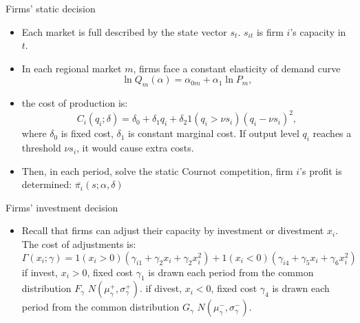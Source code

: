 \documentclass[aspectratio=169]{beamer}  %
\begin{document}
\begin{frame}{Firms' static decision}    
    \begin{itemize}
    \item Each market is full described by the state vector $s_{t}$. $s_{it}$ is firm $i$'s capacity in $t$.
    \item In each regional market $m$, firms face a constant elasticity of demand curve
    \[
    \ln Q_{m}(\alpha) = \alpha_{0m} + \alpha_1 \ln P_{m},
    \]
    \item the cost of production is:
    \[
    C_i(q_i; \delta) = \delta_0 + \delta_1 q_i + \delta_2 1(q_i > \nu s_i)(q_i - \nu s_i)^2, 
    \]
    where $\delta_0$ is fixed cost, $\delta_1$ is constant marginal cost. If output level $q_{i}$ reaches a threshold $\nu s_i$, it would cause extra costs.
    \item Then, in each period, solve the static Cournot competition, firm $i$'s profit is determined: $\bar{\pi_i}(s;\alpha, \delta)$
  
    \end{itemize}
\end{frame}

\begin{frame}{Firms' investment decision}    
    \begin{itemize}
   \item Recall that firms can adjust their capacity by investment or divestment $x_i$. The cost of adjustments is:
   \[
    \Gamma(x_i;\gamma)=1(x_i>0)(\gamma_{i1}+\gamma_2x_i+\gamma_2x_i^2)+1(x_i<0)(\gamma_{i4}+\gamma_5x_i+\gamma_6x_i^2)
    \]
    if invest, $x_i>0$, fixed cost $\gamma_{1}$ is drawn each period from the common distribution $F_{\gamma}$ $N(\mu_{\gamma}^+,\sigma_{\gamma}^+)$.
    if divest, $x_i<0$, fixed cost $\gamma_{4}$ is drawn each period from the common distribution $G_{\gamma}$ $N(\mu_{\gamma}^-,\sigma_{\gamma}^-)$.
    \end{itemize}
\end{frame}
\end{document}
